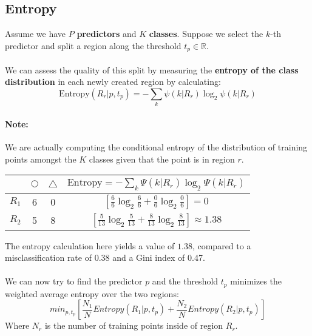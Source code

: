 \documentclass[10pt,a4paper]{report}
\begin{document}
\subsection{Entropy}
Assume we have $P$ \textbf{predictors} and $K$ \textbf{classes}. Suppose we select the $k$-th predictor and split a region along the threshold $t_p\in\mathbb{R}$.\\\\
We can assess the quality of this split by measuring the \textbf{entropy of the class distribution} in each newly created region by calculating:
$$\textrm{Entropy}(R_r|p,	t_p) = - \sum_k\psi(k|R_r)\log_2\psi(k|R_r)$$
\begin{framed}
\paragraph{Note:} We are actually computing the conditional entropy of the distribution of training points amongst the $K$ classes given that the point is in region $r$.
\end{framed}
\begin{center}
\begin{tabular}{ |c|c|c|c| } 
 \hline
  & $\bigcirc$ & $\triangle$ & $\textrm{Entropy}= - \sum_k\Psi(k|R_r)\log_2\Psi(k|R_r)$\\\hline\hline
 $R_1$ & 6 & 0 & $\left[\frac{6}{6}\log_2\frac{6}{6}+\frac{0}{6}\log_2\frac{0}{6}\right] = 0$\\\hline
 $R_2$ & 5 & 8 & $\left[\frac{5}{13}\log_2\frac{5}{13}+\frac{8}{13}\log_2\frac{8}{13}\right] \approx 1.38$\\\hline
\end{tabular}
\end{center}
The entropy calculation here yields a value of $1.38$, compared to a misclassification rate of 0.38 and a Gini index of 0.47.\\\\
We can now try to find the predictor $p$ and the threshold $t_p$ minimizes the weighted average entropy over the two regions:
$$min_{p,t_p}\left[\frac{N_1}{N}Entropy(R_1|p,t_p)+\frac{N_2}{N}Entropy(R_2|p,t_p)\right]$$
Where $N_r$ is the number of training points inside of region $R_r$.
\end{document}

